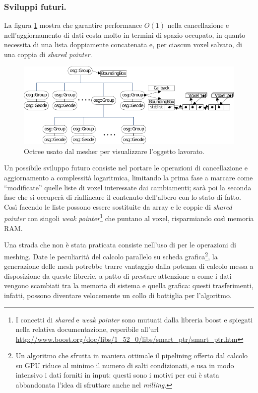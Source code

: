 \subsubsection{Sviluppi futuri.}
La figura \ref{fig:meshing_octree} mostra che garantire performance $O(1)$ nella cancellazione e nell'aggiornamento di dati costa molto in termini di spazio occupato, in quanto necessita di una lista doppiamente concatenata e, per ciascun voxel salvato, di una coppia di \emph{shared pointer}.
\begin{figure}[htp]
	\centering
	\includegraphics[width=.85\textwidth]{img/meshing_octree}
	\caption{Octree usato dal mesher per visualizzare l'oggetto lavorato.}
	\label{fig:meshing_octree}
\end{figure}
Un possibile sviluppo futuro consiste nel portare le operazioni di cancellazione e aggiornamento a complessità logaritmica, limitando la prima fase a marcare come ``modificate'' quelle liste di voxel interessate dai cambiamenti; sarà poi la seconda fase che si occuperà di riallineare il contenuto dell'albero con lo stato di fatto. Così facendo le liste possono essere sostituite da array e le coppie di \emph{shared pointer} con singoli \emph{weak pointer}\footnote{I concetti di \emph{shared} e \emph{weak pointer} sono mutuati dalla libreria boost e spiegati nella relativa documentazione, reperibile all'url \url{http://www.boost.org/doc/libs/1_52_0/libs/smart_ptr/smart_ptr.htm}} che puntano al voxel, risparmiando così memoria RAM.

Una strada che non è stata praticata consiste nell'uso di \cuda per le operazioni di meshing. Date le peculiarità del calcolo parallelo su scheda grafica\footnote{Un algoritmo che sfrutta in maniera ottimale il pipelining offerto dal calcolo su GPU riduce al minimo il numero di salti condizionati, e usa in modo intensivo i dati forniti in input: questi sono i motivi per cui è stata abbandonata l'idea di sfruttare \cuda anche nel \emph{milling}.}, la generazione delle mesh potrebbe trarre vantaggio dalla potenza di calcolo messa a disposizione da queste librerie, a patto di prestare attenzione a come i dati vengono scambiati tra la memoria di sistema e quella grafica: questi trasferimenti, infatti, possono diventare velocemente un collo di bottiglia per l'algoritmo.
